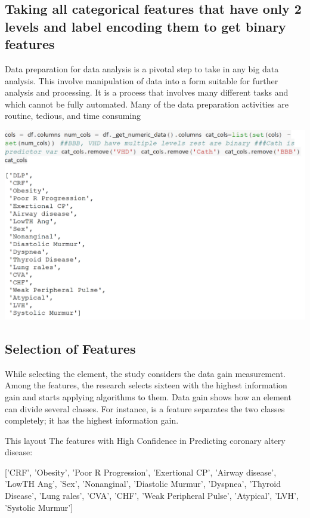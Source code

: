 \documentclass[sigconf]{acmart}
\begin{document}
\subsection{Taking all categorical features that have only 2 levels and label encoding them to get binary features}

Data preparation for data analysis is a pivotal step to take in any big data analysis. This involve manipulation of data into a form suitable for further analysis and processing. It is a process that involves many different tasks and which cannot be fully automated. Many of the data preparation activities are routine, tedious, and time consuming

\includegraphics[width=0.95\columnwidth]{project/images/Untitled3.png}

\subsection{Selection of Features}

While selecting the element, the study considers the data gain measurement. Among the features, the research selects sixteen with the highest information gain and starts applying algorithms to them. Data gain shows how an element can divide several classes. For instance, is a feature separates the two classes completely; it has the highest information gain.

This layout The features with High Confidence in Predicting coronary altery disease:


['CRF',
    'Obesity',
    'Poor R Progression',
    'Exertional CP',
    'Airway disease',
    'LowTH Ang',
    'Sex',
    'Nonanginal',
    'Diastolic Murmur',
    'Dyspnea',
    'Thyroid Disease',
   'Lung rales',
    'CVA',
    'CHF',
    'Weak Peripheral Pulse',
    'Atypical',
    'LVH',
    'Systolic Murmur']
\end{document}
